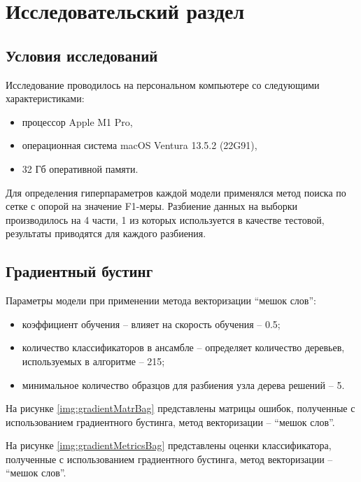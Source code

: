 \section{Исследовательский раздел}
\subsection{Условия исследований}
Исследование проводилось на персональном компьютере со следующими характеристиками:

\begin{itemize}
\item процессор Apple M1 Pro,
\item операционная система macOS Ventura 13.5.2 (22G91),
\item 32 Гб оперативной памяти.
\end{itemize}

Для определения гиперпараметров каждой модели применялся метод поиска по сетке с опорой на значение F1-меры. Разбиение данных на выборки производилось на 4 части, 1 из которых используется в качестве тестовой, результаты приводятся для каждого разбиения.

\subsection{Градиентный бустинг}

Параметры модели при применении метода векторизации ``мешок слов'':
\begin{itemize}
	\item коэффициент обучения -- влияет на скорость обучения -- 0.5;
	\item количество классификаторов в ансамбле -- определяет количество деревьев, используемых в алгоритме -- 215;
	\item минимальное количество образцов для разбиения узла дерева решений -- 5.
\end{itemize}

На рисунке \ref{img:gradientMatrBag} представлены матрицы ошибок, полученные с использованием градиентного бустинга, метод векторизации -- ``мешок слов''.

На рисунке \ref{img:gradientMetricsBag} представлены оценки классификатора, полученные с использованием градиентного бустинга, метод векторизации -- ``мешок слов''.

